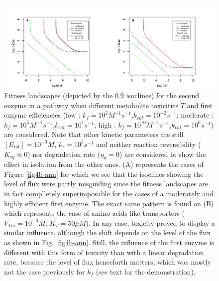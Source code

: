 \begin{figure}[h!]
\centering
\includegraphics[scale=0.46,trim=0cm 0cm 0cm 0cm,clip]{pics/SM-Enzymes/2DFit_Landscape_2Enz_First_Enz_Influence_Tox_Allflux.jpeg} 
\caption{Fitness landscapes (depicted by the 0.9 isoclines) for the second enzyme in a pathway when different metabolite toxicities $T$ and first enzyme efficiencies (low : $k_f=10^2M^{-1}s^{-1}$,$k_{cat}=10^{-2}s^{-1}$; moderate : $k_f=10^5M^{-1}s^{-1}$,$k_{cat}=10^1s^{-1}$; high : $k_f=10^{10}M^{-1}s^{-1}$,$k_{cat}=10^6s^{-1}$) are considered. Note that other kinetic parameters are still $[E_{tot}]=10^{-3}M$, $k_r=10^3s^{-1}$ and neither reaction reversibility ($K_{eq} \approx 0$) nor degradation rate ($\eta_d=0$) are considered to show the effect in isolation from the other ones. (A) represents the cases of Figure \ref{fig4b-ann} for which we see that the isoclines showing the level of flux were partly misguiding since the fitness landscapes are in fact complletely superimposable for the cases of a moderately and highly efficient first enzyme. The exact same pattern is found on (B) which represents the case of amino acids like transporters ($V_{Tm}=10^{-6}M$, $K_T=50\mu M$). In any case, toxicity proved to display a similar influence, although the shift depends on the level of the flux as shown in Fig. \ref{fig4b-ann}. Still, the influence of the first enzyme is different with this form of toxicity than with a linear degradation rate, because the level of flux henceforth matters, which was mostly not the case previously for $k_f$ (see text for the demonstration).}
\label{fig4c-ann}
\end{figure}

